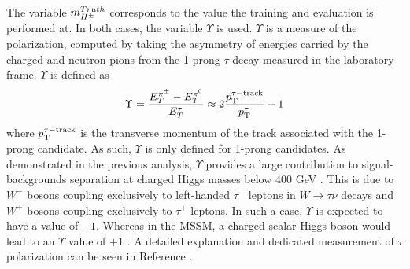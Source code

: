			The variable $m_{H^{\pm}}^{Truth}$ corresponds to the \mHpm value the training and evaluation is performed at. In both cases, the variable $\Upsilon$ is used. $\Upsilon$ is a measure of the \tauhad polarization, computed by taking the asymmetry of energies carried by the charged and neutron pions from the 1-prong $\tau$ decay measured in the laboratory frame. $\Upsilon$ is defined as
			\begin{equation}\label{eqn:upsilon}
			\Upsilon = \frac{ E^{\pi^{\pm}}_{T} - E^{\pi^{0}}_{T}}{E^{\tau}_{T}} \approx 2 \frac{p_{\text{T}}^{\tau-\mathrm{track}}}{p_{\text{T}}^{\tau}} -1
			\end{equation}
			where $p_{\text{T}}^{\tau-\mathrm{track}}$ is the transverse momentum of the track associated with the 1-prong \tauhad candidate. As such, $\Upsilon$ is only defined for 1-prong \tauhad candidates. As demonstrated in the previous analysis, $\Upsilon$ provides a large contribution to signal-backgrounds separation at charged Higgs masses below 400 GeV \cite{hpm-previous}. This is due to $W^{-}$ bosons coupling exclusively to left-handed $\tau^{-}$ leptons in $W \to \tau \nu$ decays and $W^{+}$ bosons coupling exclusively to $\tau^{+}$ leptons. In such a case, $\Upsilon$ is expected to have a value of $-1$. Whereas in the \gls{MSSM}, a charged scalar Higgs boson would lead to an $\Upsilon$ value of $+1$ \cite{tau-polarization}. A detailed explanation and dedicated measurement of $\tau$ polarization can be seen in Reference \cite{tau-polarization}.

